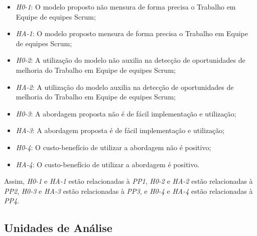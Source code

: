 \begin{itemize}
  \item \textit{H0-1}: O modelo proposto não mensura de forma precisa o Trabalho em Equipe de equipes Scrum;
  \item \textit{HA-1}: O modelo proposto mensura de forma precisa o Trabalho em Equipe de equipes Scrum;
  \item \textit{H0-2}: A utilização do modelo não auxilia na detecção de oportunidades de melhoria do Trabalho em Equipe de equipes Scrum;
  \item \textit{HA-2}: A utilização do modelo auxilia na detecção de oportunidades de melhoria do Trabalho em Equipe de equipes Scrum;
  \item \textit{H0-3}: A abordagem proposta não é de fácil implementação e utilização;
  \item \textit{HA-3}: A abordagem proposta é de fácil implementação e utilização;
  \item \textit{H0-4}: O custo-benefício de utilizar a abordagem não é positivo;
  \item \textit{HA-4}: O custo-benefício de utilizar a abordagem é positivo.
\end{itemize}

Assim, \textit{H0-1} e \textit{HA-1} estão relacionadas à \textit{PP1}, \textit{H0-2} e \textit{HA-2} estão relacionadas à \textit{PP2}, \textit{H0-3} e \textit{HA-3} estão relacionadas à \textit{PP3}, e \textit{H0-4} e \textit{HA-4} estão relacionadas à \textit{PP4}.

\subsection{Unidades de Análise}
\label{estudodecaso:design:unidades}

